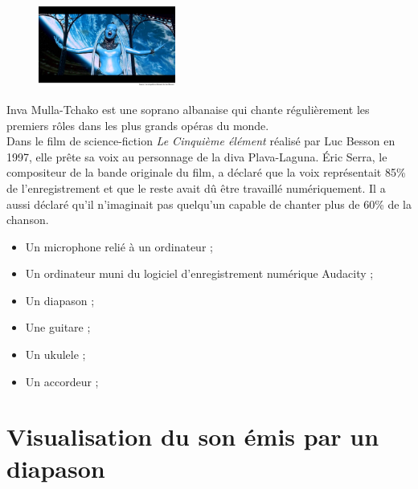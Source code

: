 
\begin{tcolorbox}[colback=orange!5!white,colframe=orange!75!black,title= Scénario:]
\begin{figure}
\vspace{-0.6cm}
    \centering
     \includegraphics[width=0.4\textwidth]{Images/Cinquieme_element.jpg}
   \end{figure}
Inva Mulla-Tchako est une soprano albanaise qui chante régulièrement les premiers rôles dans les plus grands opéras du monde.\\
Dans le film de science-fiction \textit{Le Cinquième élément} réalisé par Luc Besson en 1997, elle prête sa voix au personnage de la diva Plava-Laguna. Éric Serra, le compositeur de la bande originale du film, a déclaré que la voix représentait 85\% de l'enregistrement et que le reste avait dû être travaillé numériquement. Il a aussi déclaré qu'il n'imaginait pas quelqu'un capable de chanter plus de 60\% de la chanson.\\

\end{tcolorbox}


\begin{mdframed}[style=autreexo]
\textbf{}
\begin{itemize}
    \item Un microphone relié à un ordinateur ;
    \item Un ordinateur muni du logiciel d'enregistrement numérique Audacity ;
    \item Un diapason ;
    \item Une guitare ;
    \item Un ukulele ;
    \item Un accordeur ;
\end{itemize}
\end{mdframed}
 
\newpage

\section{Visualisation du son émis par un diapason}

